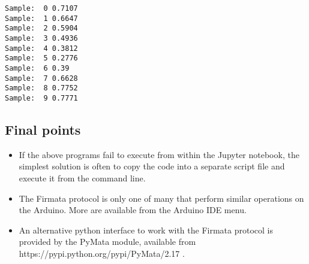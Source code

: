 \documentclass[10pt]{article}
\providecommand{\tightlist}{%
      \setlength{\itemsep}{0pt}\setlength{\parskip}{0pt}}
\begin{document}
    \begin{Verbatim}[commandchars=\\\{\}]
Sample:  0 0.7107
Sample:  1 0.6647
Sample:  2 0.5904
Sample:  3 0.4936
Sample:  4 0.3812
Sample:  5 0.2776
Sample:  6 0.39
Sample:  7 0.6628
Sample:  8 0.7752
Sample:  9 0.7771

    \end{Verbatim}

    \hypertarget{a.8-final-points}{%
\subsection{Final points}\label{a.8-final-points}}

\begin{itemize}
\tightlist
\item
  If the above programs fail to execute from within the Jupyter
  notebook, the simplest solution is often to copy the code into a
  separate script file and execute it from the command line.
\item
  The Firmata protocol is only one of many that perform similar
  operations on the Arduino. More are available from the Arduino IDE
  menu.
\item
  An alternative python interface to work with the Firmata protocol is
  provided by the PyMata module, available from
  https://pypi.python.org/pypi/PyMata/2.17 .
\end{itemize}


    
    
    
    
\end{document}

